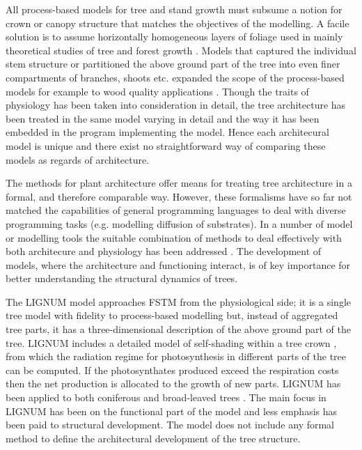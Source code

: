 All  process-based  models  \citep{landsberg:86}  for tree  and  stand
growth  must subsume  a  notion  for crown  or  canopy structure  that
matches  the objectives  of the  modelling.  A  facile solution  is to
assume  horizontally  homogeneous layers  of  foliage  used in  mainly
theoretical     studies     of      tree     and     forest     growth
\citep{hari:82,sievanen:93}.  Models that captured the individual stem
structure or partitioned  the above ground part of  the tree into even
finer  compartments  of  branches,  shoots  etc.  \citep{kellomaki:95,
  makela:97-1}  expanded the  scope  of the  process-based models  for
example to wood  quality applications \citep{kellomaki:99, makela:03}.
Though the traits  of physiology has been taken  into consideration in
detail,  the tree  architecture has  been  treated in  the same  model
varying in  detail and  the way  it has been  embedded in  the program
implementing the  model.  Hence each architecural model  is unique and
there  exist  no straightforward  way  of  comparing  these models  as
regards of architecture.


The methods  for plant architecture \citep{pp:90,dereffye:97,godin:99}
offer means for treating tree  architecture in a formal, and therefore
comparable way. However, these formalisms  have so far not matched the
capabilities  of general  programming languages  to deal  with diverse
programming  tasks (e.g.   modelling  diffusion of  substrates). In  a
number of model or modelling tools the suitable combination of methods
to  deal effectively  with both  architecure and  physiology  has been
addressed \citep{kurth:99,  eschenbach:00, karwowski:03, yan:04}.  The
development  of   models,  where  the   architecture  and  functioning
interact, is of key importance for better understanding the structural
dynamics of trees.

The LIGNUM model approaches FSTM  from the physiological side; it is a
single tree model  \citep{perttunen:96} with fidelity to process-based
modelling  \citep[see  e.g.][]{nikinmaa:92, sievanen:93,  makela:97-1}
but,  instead of  aggregated tree  parts, it  has  a three-dimensional
description of the  above ground part of the  tree.  LIGNUM includes a
detailed    model    of    self-shading    within   a    tree    crown
\citep{perttunen:98,  perttunen:01}, from  which the  radiation regime
for photosynthesis in different parts of the tree can be computed.  If
the photosynthates produced exceed  the respiration costs then the net
production is allocated  to the growth of new  parts.  LIGNUM has been
applied to both coniferous \citep{perttunen:96,lo:99} and broad-leaved
trees \citep{perttunen:01}.  The main focus  in LIGNUM has been on the
functional  part of  the  model and  less  emphasis has  been paid  to
structural development.  The model  does not include any formal method
to define the architectural development of the tree structure.

